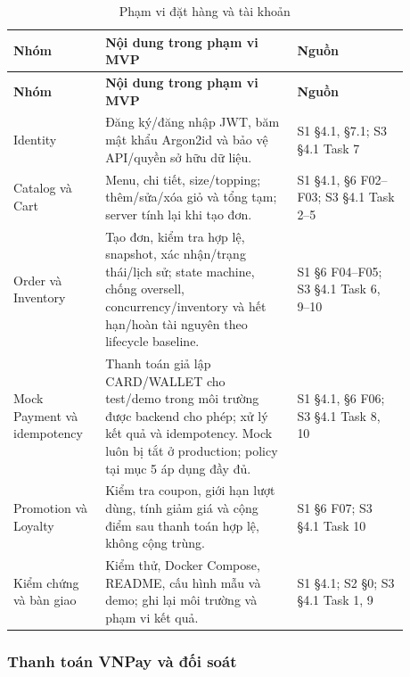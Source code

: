 \begingroup\small
\renewcommand{\arraystretch}{1.2}
\begin{longtable}{>{\raggedright\arraybackslash}p{0.20\linewidth}>{\raggedright\arraybackslash}p{0.43\linewidth}>{\raggedright\arraybackslash}p{0.25\linewidth}}
\caption{Phạm vi đặt hàng và tài khoản}\label{tab:auto-context-and-scope-3}\\
\hline
\textbf{Nhóm} & \textbf{Nội dung trong phạm vi MVP} & \textbf{Nguồn} \\ \hline
\endfirsthead
\textbf{Nhóm} & \textbf{Nội dung trong phạm vi MVP} & \textbf{Nguồn} \\ \hline
\endhead
Identity & Đăng ký/đăng nhập JWT, băm mật khẩu Argon2id và bảo vệ API/quyền sở hữu dữ liệu. & S1 §4.1, §7.1; S3 §4.1 Task 7 \\ \hline
Catalog và Cart & Menu, chi tiết, size/topping; thêm/sửa/xóa giỏ và tổng tạm; server tính lại khi tạo đơn. & S1 §4.1, §6 F02--F03; S3 §4.1 Task 2--5 \\ \hline
Order và Inventory & Tạo đơn, kiểm tra hợp lệ, snapshot, xác nhận/trạng thái/lịch sử; state machine, chống oversell, concurrency/inventory và hết hạn/hoàn tài nguyên theo lifecycle baseline. & S1 §6 F04--F05; S3 §4.1 Task 6, 9--10 \\ \hline
Mock Payment và idempotency & Thanh toán giả lập CARD/WALLET cho test/demo trong môi trường được backend cho phép; xử lý kết quả và idempotency. Mock luôn bị tắt ở production; policy tại mục 5 áp dụng đầy đủ. & S1 §4.1, §6 F06; S3 §4.1 Task 8, 10 \\ \hline
Promotion và Loyalty & Kiểm tra coupon, giới hạn lượt dùng, tính giảm giá và cộng điểm sau thanh toán hợp lệ, không cộng trùng. & S1 §6 F07; S3 §4.1 Task 10 \\ \hline
Kiểm chứng và bàn giao & Kiểm thử, Docker Compose, README, cấu hình mẫu và demo; ghi lại môi trường và phạm vi kết quả. & S1 §4.1; S2 §0; S3 §4.1 Task 1, 9 \\ \hline
\end{longtable}
\endgroup

\subsubsection{Thanh toán VNPay và đối soát}

